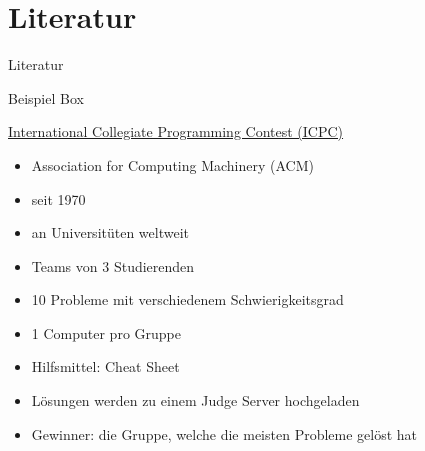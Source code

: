 \documentclass[aspectratio=169,xcolor=dvipsnames, t]{beamer}
\begin{document}
	
	\section{Literatur}
	\begin{frame}{Literatur}
		
	\end{frame}
	
	
	\begin{frame}{Beispiel Box}
		\begin{block}{\href{https://icpc.global/}{International Collegiate Programming Contest (ICPC)}}
			\begin{itemize}
				\item Association for Computing Machinery (ACM)
				\item seit 1970
				\item an Universit\"uten weltweit
			\end{itemize}
		\end{block}
		\begin{itemize}
			\item Teams von 3 Studierenden
			\item 10 Probleme mit verschiedenem Schwierigkeitsgrad
			\item 1 Computer pro Gruppe
			\item Hilfsmittel: \glqq Cheat Sheet\grqq
			\item L\"osungen werden zu einem Judge Server hochgeladen
			\item Gewinner: die Gruppe, welche die meisten Probleme gel\"ost hat
		\end{itemize}
		
	\end{frame}
	
\end{document}
